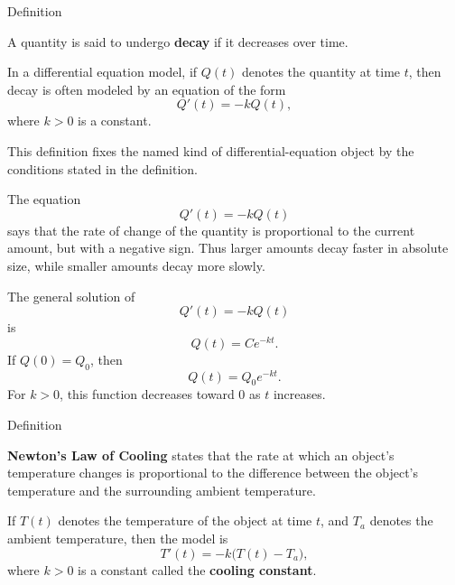 
\begin{definitionbox}{Definition}
\begin{definition}[Decay]
\label{def:ordinary-differential-equations-models-decay}
A quantity is said to undergo \textbf{decay} if it decreases over time.

In a differential equation model, if $Q(t)$ denotes the quantity at time $t$, then decay is often modeled by an equation of the form
\[
Q'(t)=-kQ(t),
\]
where $k>0$ is a constant.
\end{definition}
\end{definitionbox}

\begin{remark*}
This definition fixes the named kind of differential-equation object by the
conditions stated in the definition.
\end{remark*}

\NoLocalDependencies

\begin{remark*}[Interpretation]
The equation
\[
Q'(t)=-kQ(t)
\]
says that the rate of change of the quantity is proportional to the current amount, but with a negative sign. Thus larger amounts decay faster in absolute size, while smaller amounts decay more slowly.
\end{remark*}

\begin{example*}
The general solution of
\[
Q'(t)=-kQ(t)
\]
is
\[
Q(t)=Ce^{-kt}.
\]
If $Q(0)=Q_0$, then
\[
Q(t)=Q_0e^{-kt}.
\]
For $k>0$, this function decreases toward $0$ as $t$ increases.
\end{example*}





\begin{definitionbox}{Definition}
\begin{definition}
\label{def:ordinary-differential-equations-models-newton-s-law-of-cooling}
\textbf{Newton's Law of Cooling} states that the rate at which an object's temperature changes is proportional to the difference between the object's temperature and the surrounding ambient temperature.

If $T(t)$ denotes the temperature of the object at time $t$, and $T_a$ denotes the ambient temperature, then the model is
\[
T'(t)=-k\bigl(T(t)-T_a\bigr),
\]
where $k>0$ is a constant called the \textbf{cooling constant}.
\end{definition}
\end{definitionbox}

